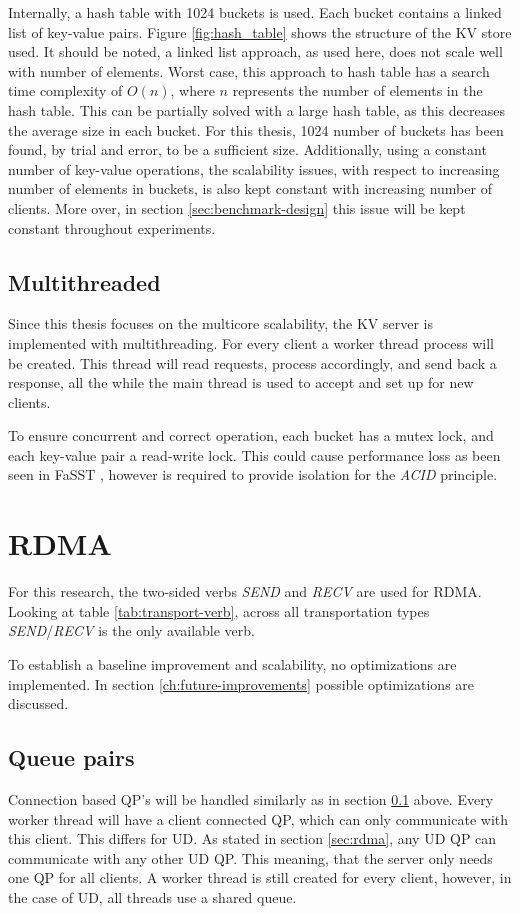 Internally, a hash table with 1024 buckets is used.
Each bucket contains a linked list of key-value pairs.
Figure \ref{fig:hash_table} shows the structure of the KV store used.
It should be noted, a linked list approach, as used here, does not scale well with number of elements.
Worst case, this approach to hash table has a search time complexity of $O(n)$, where $n$ represents the number of elements in the hash table.
This can be partially solved with a large hash table, as this decreases the average size in each bucket.
For this thesis, 1024 number of buckets has been found, by trial and error, to be a sufficient size.
Additionally, using a constant number of key-value operations, the scalability issues, with respect to increasing number of elements in buckets, is also kept constant with increasing number of clients.
More over, in section \ref{sec:benchmark-design} this issue will be kept constant throughout experiments.

\subsection{Multithreaded}\label{subsec:multithreaded}
Since this thesis focuses on the multicore scalability, the KV server is implemented with multithreading.
For every client a worker thread process will be created.
This thread will read requests, process accordingly, and send back a response, all the while the main thread is used to accept and set up for new clients.

To ensure concurrent and correct operation, each bucket has a mutex lock, and each key-value pair a read-write lock.
This could cause performance loss as been seen in FaSST \cite{kalia2016fasst, qiu2018toward}, however is required to provide isolation for the \textit{ACID} principle.

\section{RDMA}\label{sec:rdma2}
For this research, the two-sided verbs \textit{SEND} and \textit{RECV} are used for RDMA.
Looking at table \ref{tab:transport-verb}, across all transportation types \textit{SEND}/\textit{RECV} is the only available verb.

To establish a baseline improvement and scalability, no optimizations are implemented.
In section \ref{ch:future-improvements} possible optimizations are discussed.

\subsection{Queue pairs}
Connection based QP's will be handled similarly as in section \ref{subsec:multithreaded} above.
Every worker thread will have a client connected QP, which can only communicate with this client.
This differs for UD.
As stated in section \ref{sec:rdma}, any UD QP can communicate with any other UD QP.
This meaning, that the server only needs one QP for all clients.
A worker thread is still created for every client, however, in the case of UD, all threads use a shared queue.


